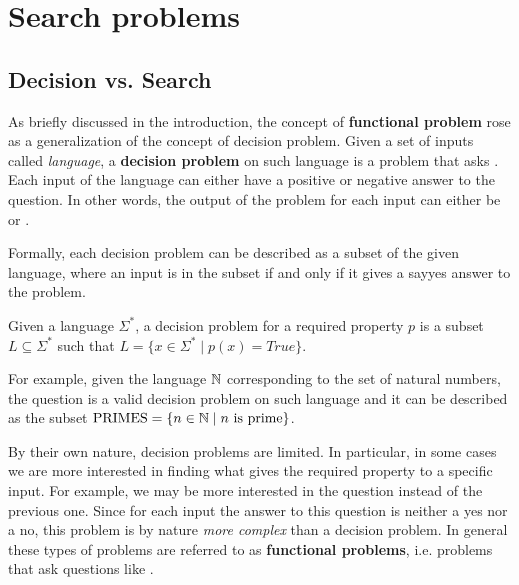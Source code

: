 \hypersetup{colorlinks=true, linkcolor=blue, citecolor=red}

\chapter{Search problems} \label{chap:search_problems}

\section{Decision vs. Search}

As briefly discussed in the introduction, the concept of \textbf{functional problem} rose as a generalization of the concept of decision problem. Given a set of inputs called \textit{language}, a \textbf{decision problem} on such language is a problem that asks . Each input of the language can either have a positive or negative answer to the question. In other words, the output of the problem for each input can either be  or . 

Formally, each decision problem can be described as a subset of the given language, where an input is in the subset if and only if it gives a say{yes} answer to the problem.

\begin{definition}
    Given a language $\Sigma^*$, a decision problem for a required property $p$ is a subset $L \subseteq \Sigma^*$ such that $L = \{x \in \Sigma^* \mid p(x) = True\}$.
\end{definition}

For example, given the language $\mathbb{N}$ corresponding to the set of natural numbers, the question  is a valid decision problem on such language and it can be described as the subset $\mathrm{PRIMES} = \{n \in \mathbb{N} \mid n \text{ is prime}\}$.

By their own nature, decision problems are limited. In particular, in some cases we are more interested in finding what gives the required property to a specific input. For example, we may be more interested in the question  instead of the previous one. Since for each input the answer to this question is neither a yes nor a no, this problem is by nature \textit{more complex} than a decision problem. In general these types of problems are referred to as \textbf{functional problems}, i.e. problems that ask questions like . 

